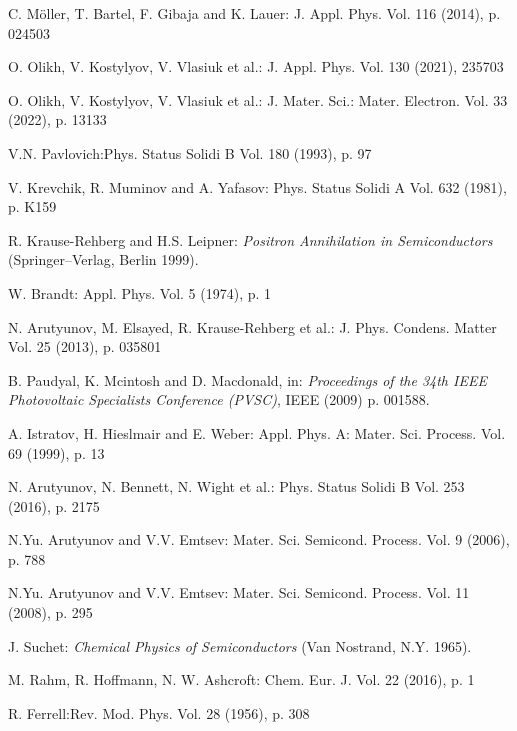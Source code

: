 \documentclass{ttp}
\begin{document}
\begin{thebibliography}{99}
 C. M\"{o}ller, T. Bartel, F. Gibaja and K. Lauer: J. Appl. Phys. Vol. 116 (2014), p. 024503

 O. Olikh, V. Kostylyov, V. Vlasiuk et al.: J. Appl. Phys. Vol. 130 (2021), 235703

 O. Olikh, V. Kostylyov, V. Vlasiuk et al.: J. Mater. Sci.: Mater. Electron. Vol. 33 (2022), p. 13133

 V.N. Pavlovich:Phys. Status Solidi B Vol. 180 (1993), p. 97

  V. Krevchik, R. Muminov and A. Yafasov: Phys. Status Solidi A Vol. 632 (1981), p. K159

 R. Krause-Rehberg and H.S. Leipner: \textit{Positron Annihilation in Semiconductors }(Springer–Verlag, Berlin 1999).

W. Brandt: Appl. Phys. Vol. 5 (1974), p. 1

 N. Arutyunov, M. Elsayed, R. Krause-Rehberg et al.: J. Phys. Condens. Matter Vol. 25 (2013), p. 035801

 B. Paudyal, K. Mcintosh and D. Macdonald, in: \textit{Proceedings of the 34th
IEEE Photovoltaic Specialists Conference (PVSC)}, IEEE (2009) p. 001588.

 A. Istratov, H. Hieslmair and E. Weber: Appl. Phys. A: Mater. Sci. Process. Vol. 69 (1999), p. 13

  N. Arutyunov, N. Bennett, N. Wight et al.: Phys. Status Solidi B Vol. 253 (2016), p. 2175

 N.Yu. Arutyunov and V.V. Emtsev: Mater. Sci. Semicond. Process. Vol. 9 (2006), p. 788

 N.Yu. Arutyunov and V.V. Emtsev: Mater. Sci. Semicond. Process. Vol. 11 (2008), p. 295

 J. Suchet: \textit{Chemical Physics of Semiconductors }(Van Nostrand, N.Y. 1965).

 M. Rahm, R. Hoffmann, N. W. Ashcroft: Chem. Eur. J. Vol. 22 (2016), p. 1

 R. Ferrell:Rev. Mod. Phys. Vol. 28 (1956), p. 308

\end{thebibliography}
\end{document}
